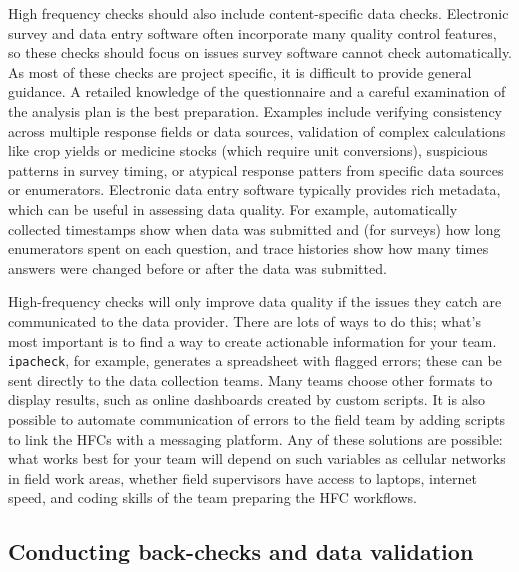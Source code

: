 High frequency checks should also include content-specific data checks.
Electronic survey and data entry software often incorporate many quality control features,
so these checks should focus on issues survey software cannot check automatically.
As most of these checks are project specific,
it is difficult to provide general guidance.
A retailed knowledge of the questionnaire and a careful examination of the analysis plan
is the best preparation.
Examples include verifying consistency across multiple response fields or data sources,
validation of complex calculations like crop yields or medicine stocks (which require unit conversions),
suspicious patterns in survey timing,
or atypical response patters from specific data sources or enumerators.
Electronic data entry software typically provides rich metadata,
which can be useful in assessing data quality.
For example, automatically collected timestamps show when data was submitted
and (for surveys) how long enumerators spent on each question,
and trace histories show how many
times answers were changed before or after the data was submitted.

High-frequency checks will only improve data quality
if the issues they catch are communicated to the data provider.
There are lots of ways to do this;
what's most important is to find a way to create actionable information for your team.
\texttt{ipacheck}, for example, generates a spreadsheet with flagged errors;
these can be sent directly to the data collection teams.
Many teams choose other formats to display results,
such as online dashboards created by custom scripts.
It is also possible to automate communication of errors to the field team
by adding scripts to link the HFCs with a messaging platform.
Any of these solutions are possible:
what works best for your team will depend on such variables as
cellular networks in field work areas, whether field supervisors have access to laptops,
internet speed, and coding skills of the team preparing the HFC workflows.

\subsection{Conducting back-checks and data validation}


